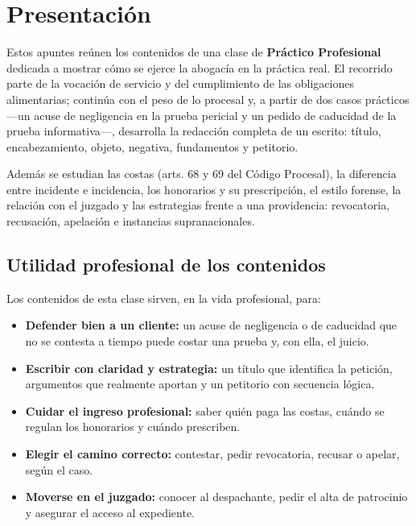 \documentclass[12pt,oneside]{book}
\begin{document}
\tableofcontents

\chapter*{Presentación}

Estos apuntes reúnen los contenidos de una clase de \textbf{Práctico Profesional} dedicada a mostrar cómo se ejerce la abogacía en la práctica real. El recorrido parte de la vocación de servicio y del cumplimiento de las obligaciones alimentarias; continúa con el peso de lo procesal y, a partir de dos casos prácticos ---un acuse de negligencia en la prueba pericial y un pedido de caducidad de la prueba informativa---, desarrolla la redacción completa de un escrito: título, encabezamiento, objeto, negativa, fundamentos y petitorio.

Además se estudian las costas (arts. 68 y 69 del Código Procesal), la diferencia entre incidente e incidencia, los honorarios y su prescripción, el estilo forense, la relación con el juzgado y las estrategias frente a una providencia: revocatoria, recusación, apelación e instancias supranacionales.

\section*{Utilidad profesional de los contenidos}

Los contenidos de esta clase sirven, en la vida profesional, para:

\begin{itemize}
    \item \textbf{Defender bien a un cliente:} un acuse de negligencia o de caducidad que no se contesta a tiempo puede costar una prueba y, con ella, el juicio.
    \item \textbf{Escribir con claridad y estrategia:} un título que identifica la petición, argumentos que realmente aportan y un petitorio con secuencia lógica.
    \item \textbf{Cuidar el ingreso profesional:} saber quién paga las costas, cuándo se regulan los honorarios y cuándo prescriben.
    \item \textbf{Elegir el camino correcto:} contestar, pedir revocatoria, recusar o apelar, según el caso.
    \item \textbf{Moverse en el juzgado:} conocer al despachante, pedir el alta de patrocinio y asegurar el acceso al expediente.
\end{itemize}
\end{document}
